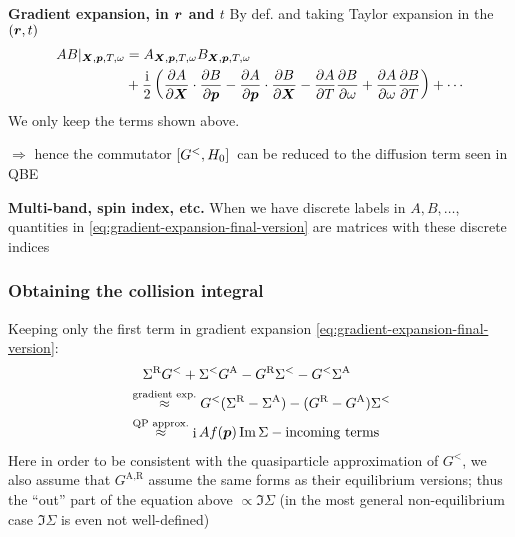 \documentclass[t]{beamer}
\DeclareMathOperator{\ii}{i}
\begin{document}
\begin{frame}[allowframebreaks]
\textbf{Gradient expansion, in $\vb*{r}$ and $t$} 
By def. and taking Taylor expansion in the $(\vb*{r}, t)$
\begin{equation}
    \begin{aligned}
        AB|_{\vb*{X}, \vb*{p}, T, \omega} &= A_{\vb*{X}, \vb*{p}, T, \omega} B_{\vb*{X}, \vb*{p}, T, \omega} \\
        &+ \frac{\ii}{2} \left(
            \pdv{A}{\vb*{X}} \cdot \pdv{B}{\vb*{p}}
            - \pdv{A}{\vb*{p}} \cdot \pdv{B}{\vb*{X}}
            - \pdv{A}{T} \pdv{B}{\omega}
            + \pdv{A}{\omega} \pdv{B}{T}
        \right) + \cdots
    \end{aligned}
    \label{eq:gradient-expansion-final-version}
\end{equation}
We only keep the terms shown above. 

$\Rightarrow$ hence the commutator $\comm*{G^<}{H_0}$ can be reduced to the diffusion term seen in QBE

\vspace{0.25cm}

\textbf{Multi-band, spin index, etc.} When we have discrete labels in $A, B, \dots$,
quantities in \eqref{eq:gradient-expansion-final-version} 
are matrices with these discrete indices

\end{frame}

\begin{frame}
\frametitle{Obtaining the collision integral}

Keeping only the first term in gradient expansion \eqref{eq:gradient-expansion-final-version}:
\begin{equation}
    \begin{aligned}
        &\quad \Sigma^{\text{R}} G^< + \Sigma^< G^{\text{A}} - G^{\text{R}} \Sigma^< - G^< \Sigma^{\text{A}}\\
        &\stackrel{\text{gradient exp.}}{\approx} G^<(\Sigma^{\text{R}} - \Sigma^{\text{A}}) 
        - (G^{\text{R}} - G^{\text{A}}) \Sigma^< \\
        &\stackrel{\text{QP approx.}}{\approx} \ii A f (\vb*{p}) \Im \Sigma
        - \text{incoming terms} 
    \end{aligned}
\end{equation}    
Here in order to be consistent with the quasiparticle approximation of $G^<$,
we also assume that $G^{\text{A}, \text{R}}$ assume 
the same forms as their equilibrium versions;
thus the ``out'' part of the equation above $\propto \Im \Sigma$
(in the most general non-equilibrium case $\Im \Sigma$ is even not well-defined)


\end{frame}
\end{document}
